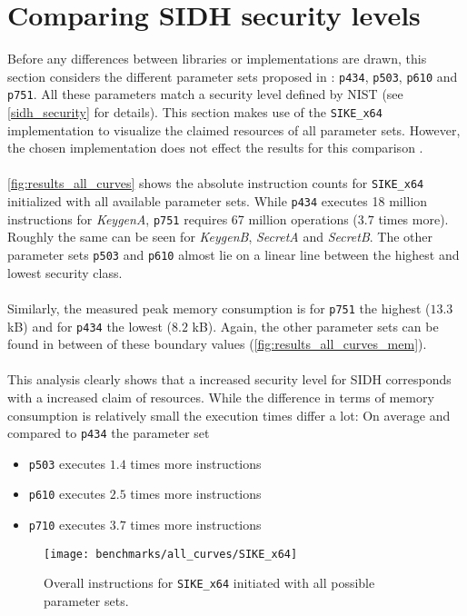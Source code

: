 \section{Comparing SIDH security levels}\label{sec:analysis_sidh_levels}

Before any differences between libraries or implementations are drawn, this section considers the different parameter sets proposed in \parencite{sike2020spec}: \texttt{p434}, \texttt{p503}, \texttt{p610} and \texttt{p751}. All these parameters match a security level defined by NIST (see \autoref{sidh_security} for details). This section makes use of the \texttt{SIKE\_x64} implementation to visualize the claimed resources of all parameter sets. However, the chosen implementation does not effect the results for this comparison .\\\\
\autoref{fig:results_all_curves} shows the absolute instruction counts for \texttt{SIKE\_x64} initialized with all available parameter sets. While \texttt{p434} executes 18 million instructions for \textit{KeygenA}, \texttt{p751} requires 67 million operations ($3.7$ times more). Roughly the same can be seen for \textit{KeygenB}, \textit{SecretA} and \textit{SecretB}. The other parameter sets \texttt{p503} and \texttt{p610} almost lie on a linear line between the highest and lowest security class.\\\\
Similarly, the measured peak memory consumption is for \texttt{p751} the highest ($13.3$ kB) and for \texttt{p434} the lowest ($8.2$ kB). Again, the other parameter sets can be found in between of these boundary values (\autoref{fig:results_all_curves_mem}). \\\\
This analysis clearly shows that a increased security level for SIDH corresponds with a increased claim of resources. While the difference in terms of memory consumption is relatively small the execution times differ a lot: On average and compared to \texttt{p434} the parameter set
\begin{itemize}
\itemsep0em 
\item \texttt{p503} executes $1.4$ times more instructions
\item \texttt{p610} executes $2.5$ times more instructions
\item \texttt{p710} executes $3.7$ times more instructions
\end{itemize}

\begin{figure}[H]
  \centering
  \texttt{[image: benchmarks/all\_curves/SIKE\_x64]}
  \caption[Overall instructions for all parameter sets via \texttt{SIKE\_x64}]
  {Overall instructions for \texttt{SIKE\_x64} initiated with all possible parameter sets.}
  \label{fig:results_all_curves}
\end{figure}

